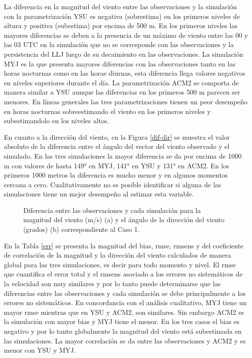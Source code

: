 \documentclass[12pt,spanish,oneside, a4paper]{book}
\begin{document}
La diferencia en la magnitud del viento entre las observaciones y la
simulación con la parametrización YSU es negativa (sobrestima) en los
primeros niveles de altura y positiva (subestima) por encima de 500 m.
En los primeros niveles las mayores diferencias se deben a la presencia
de un máximo de viento entre las 00 y las 03 UTC en la simulación que no
se corresponde con las observaciones y la persistencia del LLJ luego de
su decaimiento en las observaciones. La simulación MYJ es la que
presenta mayores diferencias con las observaciones tanto en las horas
nocturnas como en las horas diurnas, esta diferencia llega valores
negativos en niveles superiores durante el día. La parametrización ACM2
se comporta de manera similar a YSU aunque las diferencias en los
primeros 500 m parecen ser menores. En líneas generales las tres
parametrizaciones tienen un peor desempeño en horas nocturnas
sobreestimando el viento en los primeros niveles y subestimandolo en los
niveles altos.

En cuanto a la dirección del viento, en la Figura \ref{dif-dir} se
muestra el valor absoluto de la diferencia entre el ángulo del vector
del viento observado y el simulado. En las tres simulaciones la mayor
diferencia se da por encima de 1000 m con valores de hasta 149° en MYJ,
141° en YSU y 131° en ACM2. En los primeros 1000 metros la diferencia es
mucho menor y en algunos momentos cercana a cero. Cualitativamente no es
posible identificar si alguna de las simulaciones tiene un mejor
desempeño al estimar esta variable.

\begin{figure}
\caption{Diferencia entre las observaciones y cada simulación para la magnitud del viento (m/s) (a) y el ángulo de la dirección del viento (grados) (b) correspondiente al Caso 1. \label{dif}}\label{fig:diferencia}
\end{figure}

En la Tabla \ref{err} se presenta la magnitud del bias, rmse, rmsens y
del coeficiente de correlación de la magnitud y la dirección del viento
calculados de manera global para las tres simulaciones, es decir para
todo momento y nivel. El rmse que cuantifica el error total y el rmsens
asociado a los errores no sistemáticos de la velocidad son muy similares
y por lo tanto puede determinarse que las diferencias entre las
observaciones y cada simulación se debe principalmente a los errores no
sistemáticos. En concordancia con el análisis cualitativo, MYJ tiene un
mayor rmse mientras que en YSU y ACM2, son similares. Sin embargo ACM2
es la simulación con mayor bias y MYJ tiene el menor. En los tres casos
el bias es negativo y por lo tanto globalmente la magnitud del viento
está subestimada en las simulaciones. La mayor correlación se da entre
las observaciones y ACM2 y es menor con YSU y MYJ.
\end{document}
